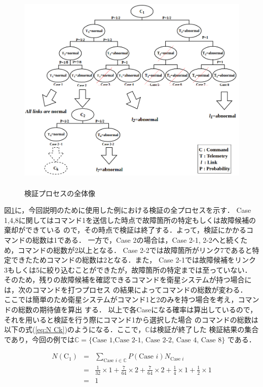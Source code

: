 \documentclass[11pt]{jsreport}
\begin{document}
\begin{figure}[H]
   \centering
      \includegraphics[height=10.0cm]{figure/all_process.png}
      \caption{検証プロセスの全体像}
      \label{fig:all_process}
\end{figure}
図\ref{fig:all_process}に，今回説明のために使用した例における検証の全プロセスを示す．
Case 1,4,8に関してはコマンド1を送信した時点で故障箇所の特定もしくは故障候補の棄却ができている
ので，その時点で検証は終了する．よって，検証にかかるコマンドの総数は1である．
一方で，Case 2の場合は，Case 2-1, 2-2へと続くため，コマンドの総数が2以上となる．
Case 2-2では故障箇所がリンク7であると特定できたためコマンドの総数は2となる．また，
Case 2-1では故障候補をリンク3もしくは5に絞り込むことができたが，故障箇所の特定までは至っていない．
そのため，残りの故障候補を確認できるコマンドを衛星システムが持つ場合には，次のコマンドを打つプロセス
の結果によってコマンドの総数が変わる．\\
ここでは簡単のため衛星システムがコマンド1と2のみを持つ場合を考え，コマンドの総数の期待値を算出
する．
以上で各Caseになる確率は算出しているので，それを用いると検証を行う際にコマンド1から選択した場合
のコマンドの総数は以下の式(\ref{eq:N Ck})のようになる．ここで，$\mathbb{C}$は検証が終了した
検証結果の集合であり，今回の例では$\mathbb{C} = \{\text{Case 1,Case 2-1, Case 2-2, Case 4, Case 8}\}$
である．

\begin{eqnarray}
   N(\text{C}_1) &=& \sum_{\text{Case }i\in\mathbb{C}} P(\text{Case }i) N_{\text{Case }i} \nonumber \\
     &=& \frac{1}{32}\times 1 + \frac{7}{64}\times 2 + \frac{7}{64}\times 2 + \frac{1}{4}\times 1 +
     \frac{1}{2}\times 1 \nonumber \\
     &=& 1 \label{eq:N Ck}
\end{eqnarray}
\end{document}

